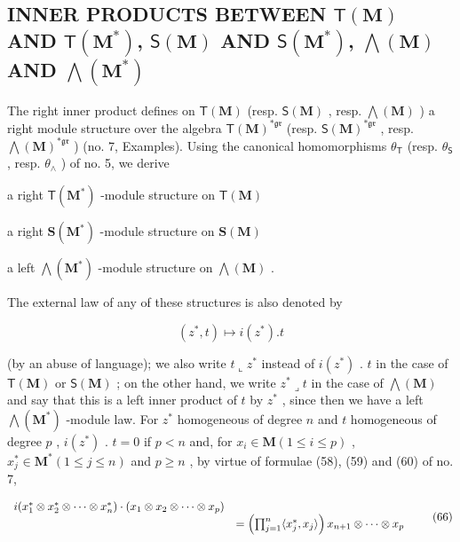 \subsection{\texorpdfstring{INNER PRODUCTS BETWEEN \(\mathsf{T}(\mathbf{M})\) AND \(\mathsf{T}(\mathbf{M}^{*})\), \(\mathsf{S}(\mathbf{M})\) AND \(\mathsf{S}(\mathbf{M}^{*})\), \(\bigwedge(\mathbf{M})\) AND \(\bigwedge(\mathbf{M}^{*})\)}{Inner products between T(M) and T(M*), S(M) and S(M*), wedge(M) and wedge(M*)}}

The right inner product defines on \(\mathsf{T}(\mathbf{M})\) (resp. \(\mathsf{S}(\mathbf{M})\) , resp. \(\bigwedge (\mathbf{M})\) ) a right module structure over the algebra \(\mathsf{T}(\mathbf{M})^{*\mathfrak{g}\mathfrak{r}}\) (resp. \(\mathsf{S}(\mathbf{M})^{*\mathfrak{g}\mathfrak{r}}\) , resp. \(\bigwedge (\mathbf{M})^{*\mathfrak{g}\mathfrak{r}}\) ) (no. 7, Examples). Using the canonical homomorphisms \(\theta_{\mathsf{T}}\) (resp. \(\theta_{\mathsf{S}}\) , resp. \(\theta_{\wedge}\) ) of no. 5, we derive

a right \(\mathsf{T}(\mathbf{M}^{*})\) -module structure on \(\mathsf{T}(\mathbf{M})\)

a right \(\mathbf{S}(\mathbf{M}^{*})\) -module structure on \(\mathbf{S}(\mathbf{M})\)

a left \(\bigwedge (\mathbf{M}^{*})\) -module structure on \(\bigwedge (\mathbf{M})\) .

The external law of any of these structures is also denoted by

\[
(z ^ {*}, t) \mapsto i (z ^ {*}). t
\]

(by an abuse of language); we also write \(t \llcorner z^*\) instead of \(i(z^*)\) . \(t\) in the case of \(\mathsf{T}(\mathbf{M})\) or \(\mathsf{S}(\mathbf{M})\) ; on the other hand, we write \(z^* \lrcorner t\) in the case of \(\bigwedge (\mathbf{M})\) and say that this is a left inner product of \(t\) by \(z^*\) , since then we have a left \(\bigwedge (\mathbf{M}^*)\) -module law. For \(z^*\) homogeneous of degree \(n\) and \(t\) homogeneous of degree \(p\) , \(i(z^*)\) . \(t = 0\) if \(p < n\) and, for \(x_i \in \mathbf{M} (1 \leqslant i \leqslant p)\) , \(x_j^* \in \mathbf{M}^* (1 \leqslant j \leqslant n)\) and \(p \geqslant n\) , by virtue of formulae (58), (59) and (60) of no. 7,

\[
\begin{array}{r l} i (x _ {1} ^ {*} \otimes x _ {2} ^ {*} \otimes \dots \otimes x _ {n} ^ {*}) \cdot (x _ {1} \otimes x _ {2} \otimes \dots \otimes x _ {p}) \\ & = \left(\prod_ {j = 1} ^ {n} \langle x _ {j} ^ {*}, x _ {j} \rangle\right) x _ {n + 1} \otimes \dots \otimes x _ {p} \end{array}\tag{66}
\]

